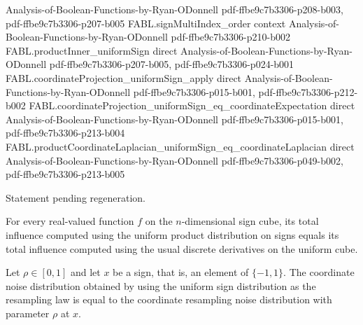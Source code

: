 \begin{theorem}
  {Analysis-of-Boolean-Functions-by-Ryan-ODonnell}
  {pdf-ffbe9c7b3306-p208-b003,
    pdf-ffbe9c7b3306-p207-b005}
\proofstep
  {FABL.signMultiIndex_order}
  {context}
  {Analysis-of-Boolean-Functions-by-Ryan-ODonnell}
  {pdf-ffbe9c7b3306-p210-b002}
\proofstep
  {FABL.productInner_uniformSign}
  {direct}
  {Analysis-of-Boolean-Functions-by-Ryan-ODonnell}
  {pdf-ffbe9c7b3306-p207-b005,
    pdf-ffbe9c7b3306-p024-b001}
\proofstep
  {FABL.coordinateProjection_uniformSign_apply}
  {direct}
  {Analysis-of-Boolean-Functions-by-Ryan-ODonnell}
  {pdf-ffbe9c7b3306-p015-b001,
    pdf-ffbe9c7b3306-p212-b002}
\proofstep
  {FABL.coordinateProjection_uniformSign_eq_coordinateExpectation}
  {direct}
  {Analysis-of-Boolean-Functions-by-Ryan-ODonnell}
  {pdf-ffbe9c7b3306-p015-b001,
    pdf-ffbe9c7b3306-p213-b004}
\proofstep
  {FABL.productCoordinateLaplacian_uniformSign_eq_coordinateLaplacian}
  {direct}
  {Analysis-of-Boolean-Functions-by-Ryan-ODonnell}
  {pdf-ffbe9c7b3306-p049-b002,
    pdf-ffbe9c7b3306-p213-b005}

Statement pending regeneration.
\end{theorem}

\begin{theorem}
\label{FABL.productTotalInfluence_uniformSign_eq_totalInfluence}
\leanok
{}
For every real-valued function $f$ on the $n$-dimensional sign cube, its total influence
computed using the uniform product distribution on signs equals its total influence
computed using the usual discrete derivatives on the uniform cube.
\end{theorem}

\begin{theorem}
\label{FABL.productCoordinateNoisePMF_uniformSign}
\leanok
{}
Let $\rho\in[0,1]$ and let $x$ be a sign, that is, an element of $\{ -1,1\}$. The
coordinate noise distribution obtained by using the uniform sign distribution as the
resampling law is equal to the coordinate resampling noise distribution with parameter
$\rho$ at $x$.
\end{theorem}


